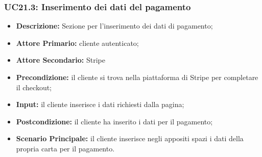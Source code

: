 \subsubsection{UC21.3: Inserimento dei dati del pagamento}
\label{sec:UC21.3}
\begin{itemize}
    \item \textbf{Descrizione:} Sezione per l'inserimento dei dati di pagamento;
    \item \textbf{Attore Primario:} cliente autenticato;
    \item \textbf{Attore Secondario:} Stripe
    \item \textbf{Precondizione:} il cliente si trova nella piattaforma di Stripe per completare il checkout;
    \item \textbf{Input:} il cliente inserisce i dati richiesti dalla pagina;
    \item \textbf{Postcondizione:} il cliente ha inserito i dati per il pagamento;
    \item \textbf{Scenario Principale:} il cliente inserisce negli appositi spazi i dati della propria carta per il pagamento.
\end{itemize}